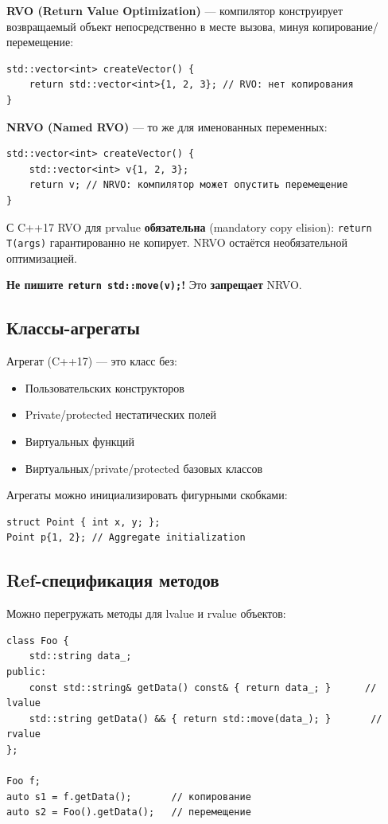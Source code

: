 \documentclass[12pt,a4paper]{article}
\begin{document}
\textbf{RVO (Return Value Optimization)} --- компилятор конструирует возвращаемый объект непосредственно в месте вызова, минуя копирование/перемещение:
\begin{lstlisting}
std::vector<int> createVector() {
    return std::vector<int>{1, 2, 3}; // RVO: нет копирования
}
\end{lstlisting}

\textbf{NRVO (Named RVO)} --- то же для именованных переменных:
\begin{lstlisting}
std::vector<int> createVector() {
    std::vector<int> v{1, 2, 3};
    return v; // NRVO: компилятор может опустить перемещение
}
\end{lstlisting}

С C++17 RVO для prvalue \textbf{обязательна} (mandatory copy elision): \texttt{return T(args)} гарантированно не копирует. NRVO остаётся необязательной оптимизацией.

\textbf{Не пишите \texttt{return std::move(v);}!} Это \textbf{запрещает} NRVO.

\subsection{Классы-агрегаты}

Агрегат (C++17) --- это класс без:
\begin{itemize}
    \item Пользовательских конструкторов
    \item Private/protected нестатических полей
    \item Виртуальных функций
    \item Виртуальных/private/protected базовых классов
\end{itemize}

Агрегаты можно инициализировать фигурными скобками:
\begin{lstlisting}
struct Point { int x, y; };
Point p{1, 2}; // Aggregate initialization
\end{lstlisting}

\subsection{Ref-спецификация методов}

Можно перегружать методы для lvalue и rvalue объектов:
\begin{lstlisting}
class Foo {
    std::string data_;
public:
    const std::string& getData() const& { return data_; }      // lvalue
    std::string getData() && { return std::move(data_); }       // rvalue
};

Foo f;
auto s1 = f.getData();       // копирование
auto s2 = Foo().getData();   // перемещение
\end{lstlisting}
\end{document}
